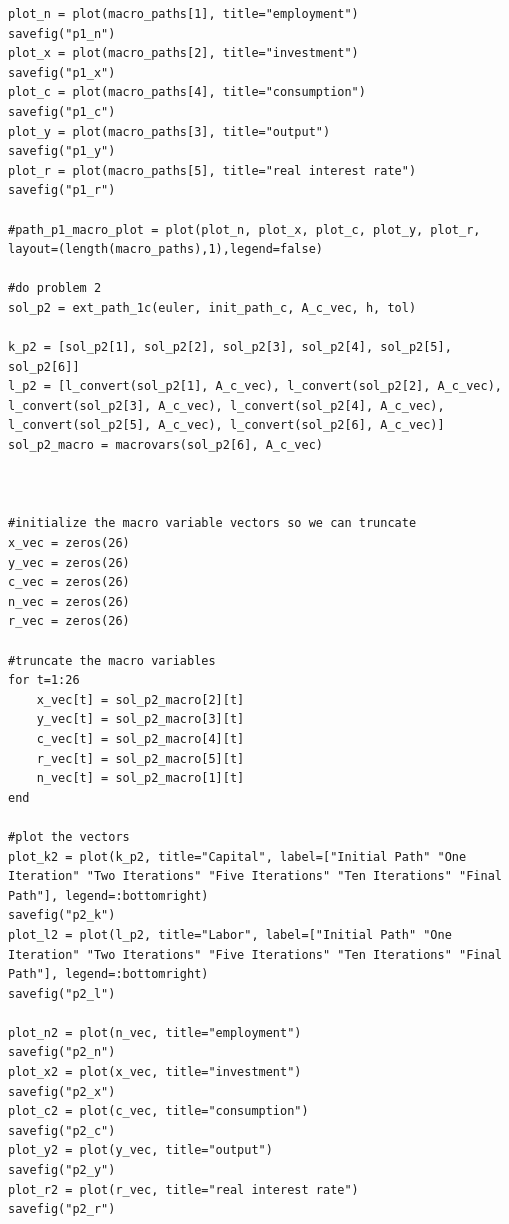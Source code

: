 \documentclass[12pt, letterpaper, parskip = full]{article}
\begin{document}
\begin{lstlisting}[breaklines]
plot_n = plot(macro_paths[1], title="employment")
savefig("p1_n")
plot_x = plot(macro_paths[2], title="investment")
savefig("p1_x")
plot_c = plot(macro_paths[4], title="consumption")
savefig("p1_c")
plot_y = plot(macro_paths[3], title="output")
savefig("p1_y")
plot_r = plot(macro_paths[5], title="real interest rate")
savefig("p1_r")

#path_p1_macro_plot = plot(plot_n, plot_x, plot_c, plot_y, plot_r, layout=(length(macro_paths),1),legend=false)

#do problem 2
sol_p2 = ext_path_1c(euler, init_path_c, A_c_vec, h, tol)

k_p2 = [sol_p2[1], sol_p2[2], sol_p2[3], sol_p2[4], sol_p2[5], sol_p2[6]]
l_p2 = [l_convert(sol_p2[1], A_c_vec), l_convert(sol_p2[2], A_c_vec), l_convert(sol_p2[3], A_c_vec), l_convert(sol_p2[4], A_c_vec), l_convert(sol_p2[5], A_c_vec), l_convert(sol_p2[6], A_c_vec)]
sol_p2_macro = macrovars(sol_p2[6], A_c_vec)



#initialize the macro variable vectors so we can truncate
x_vec = zeros(26)
y_vec = zeros(26)
c_vec = zeros(26)
n_vec = zeros(26)
r_vec = zeros(26)

#truncate the macro variables
for t=1:26
    x_vec[t] = sol_p2_macro[2][t]
    y_vec[t] = sol_p2_macro[3][t]
    c_vec[t] = sol_p2_macro[4][t]
    r_vec[t] = sol_p2_macro[5][t]
    n_vec[t] = sol_p2_macro[1][t]
end

#plot the vectors
plot_k2 = plot(k_p2, title="Capital", label=["Initial Path" "One Iteration" "Two Iterations" "Five Iterations" "Ten Iterations" "Final Path"], legend=:bottomright)
savefig("p2_k")
plot_l2 = plot(l_p2, title="Labor", label=["Initial Path" "One Iteration" "Two Iterations" "Five Iterations" "Ten Iterations" "Final Path"], legend=:bottomright)
savefig("p2_l")

plot_n2 = plot(n_vec, title="employment")
savefig("p2_n")
plot_x2 = plot(x_vec, title="investment")
savefig("p2_x")
plot_c2 = plot(c_vec, title="consumption")
savefig("p2_c")
plot_y2 = plot(y_vec, title="output")
savefig("p2_y")
plot_r2 = plot(r_vec, title="real interest rate")
savefig("p2_r")

\end{lstlisting}
\end{document}
